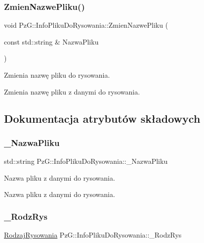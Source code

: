 \subsubsection{\texorpdfstring{Zmien\+Nazwe\+Pliku()}{ZmienNazwePliku()}}
{\footnotesize\ttfamily void Pz\+G\+::\+Info\+Pliku\+Do\+Rysowania\+::\+Zmien\+Nazwe\+Pliku (\begin{DoxyParamCaption}\item[{const std\+::string \&}]{Nazwa\+Pliku }\end{DoxyParamCaption})\hspace{0.3cm}{\ttfamily [inline]}}



Zmienia nazwę pliku do rysowania. 

Zmienia nazwę pliku z danymi do rysowania. 

\subsection{Dokumentacja atrybutów składowych}
\mbox{\label{classPzG_1_1InfoPlikuDoRysowania_a07ab06c56b9c3179e566a4123ab2a037}} 
\subsubsection{\texorpdfstring{\+\_\+\+Nazwa\+Pliku}{\_NazwaPliku}}
{\footnotesize\ttfamily std\+::string Pz\+G\+::\+Info\+Pliku\+Do\+Rysowania\+::\+\_\+\+Nazwa\+Pliku\hspace{0.3cm}{\ttfamily [private]}}



Nazwa pliku z danymi do rysowania. 

Nazwa pliku z danymi do rysowania. \mbox{\label{classPzG_1_1InfoPlikuDoRysowania_ac2512f2073c66164beb2e88db31344a4}} 
\subsubsection{\texorpdfstring{\+\_\+\+Rodz\+Rys}{\_RodzRys}}
{\footnotesize\ttfamily \hyperlink{namespacePzG_a705c92106f39b7d0c34a6739d10ff0b6}{Rodzaj\+Rysowania} Pz\+G\+::\+Info\+Pliku\+Do\+Rysowania\+::\+\_\+\+Rodz\+Rys\hspace{0.3cm}{\ttfamily [private]}}



